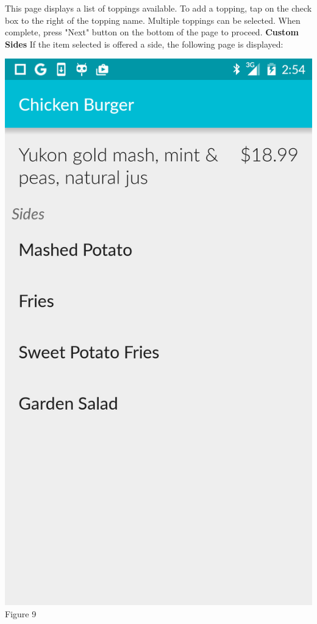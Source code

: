 \documentclass[12pt, titlepage]{article}
\begin{document}
This page displays a list of toppings available. To add a topping, tap on the check box to the right of the topping name. Multiple toppings can be selected. When complete, press "Next" button on the bottom of the page to proceed.\pagebreak
\newline
\textbf{Custom Sides}\newline
If the item selected is offered a side, the following page is displayed:
\begin{center}\includegraphics[scale=0.15]{sides.png}	\linebreak Figure 9\end{center}
\end{document}

